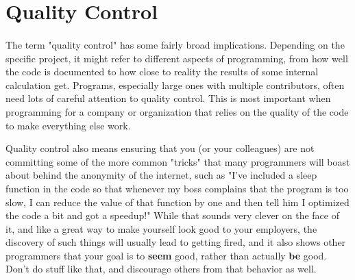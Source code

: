 \section{Quality Control}
\paragraph{}  The term "quality control" has some fairly broad implications.
Depending on the specific project, it might refer to different aspects of programming, from how well the code is documented to how close to reality the results of some internal calculation get.
Programs, especially large ones with multiple contributors, often need lots of careful attention to quality control.
This is most important when programming for a company or organization that relies on the quality of the code to make everything else work.

Quality control also means ensuring that you (or your colleagues) are not committing some of the more common "tricks" that many programmers will boast about behind the anonymity of the internet, such as "I've included a sleep function in the code so that whenever my boss complains that the program is too slow, I can reduce the value of that function by one and then tell him I optimized the code a bit and got a speedup!"
While that sounds very clever on the face of it, and like a great way to make yourself look good to your employers, the discovery of such things will usually lead to getting fired, and it also shows other programmers that your goal is to \textbf{seem} good, rather than actually \textbf{be} good.
Don't do stuff like that, and discourage others from that behavior as well.